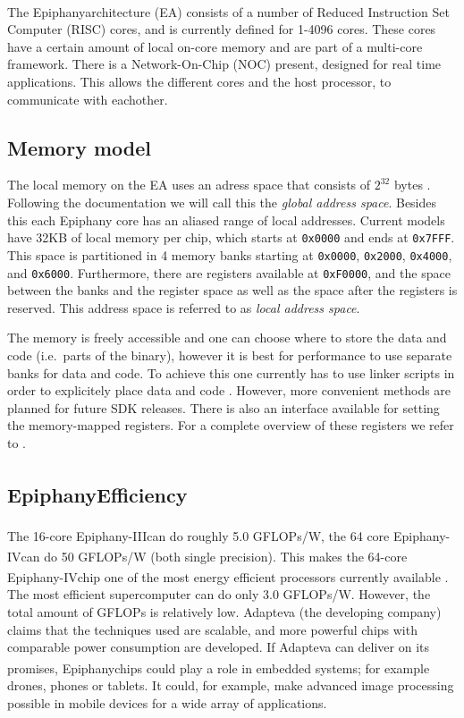 \documentclass[fleqn]{article}
\renewcommand{\(}{\left(}
\renewcommand{\)}{\right)}
\newcommand{\tm}{\textsuperscript{\texttrademark}}
\begin{document}
The Epiphany\tm architecture (EA) consists of a number of Reduced Instruction Set Computer (RISC) cores, and is currently defined for 1-4096 cores. These cores have a certain amount of local on-core memory and are part of a multi-core framework. There is a Network-On-Chip (NOC) present, designed for real time applications. This allows the different cores and the host processor, to communicate with eachother. 

\subsection{Memory model}

The local memory on the EA uses an adress space that consists of $2^{32}$ bytes \cite{ep:sdkdoc}. Following the documentation we will call this the \emph{global address space}. Besides this each Epiphany core has an aliased range of local addresses. Current models have 32KB of local memory per chip, which starts at \texttt{0x0000} and ends at \texttt{0x7FFF}. This space is partitioned in 4 memory banks starting at \texttt{0x0000}, \texttt{0x2000}, \texttt{0x4000}, and \texttt{0x6000}. Furthermore, there are registers available at \texttt{0xF0000}, and the space between the banks and the register space as well as the space after the registers is reserved. This address space is referred to as \emph{local address space}.



The memory is freely accessible and one can choose where to store the data and code (i.e.\ parts of the binary), however it is best for performance to use separate banks for data and code. To achieve this one currently has to use linker scripts in order to explicitely place data and code \cite{ep:sdkdoc}. However, more convenient methods are planned for future SDK releases. There is also an interface available for setting the memory-mapped registers. For a complete overview of these registers we refer to \cite{ep:archdoc}.

\subsection{Epiphany\tm Efficiency}
The 16-core Epiphany-III\tm can do roughly 5.0 GFLOPs/W, the 64 core Epiphany-IV\tm can do 50 GFLOPs/W (both single precision). This makes the 64-core Epiphany-IV\tm chip one of the most energy efficient processors currently available \cite{ep:power}. The most efficient supercomputer can do only 3.0 GFLOPs/W. However, the total amount of GFLOPs is relatively low. Adapteva (the developing company) claims that the techniques used are scalable, and more powerful chips with comparable power consumption are developed. If Adapteva can deliver on its promises, Epiphany\tm chips could play a role in embedded systems; for example drones, phones or tablets. It could, for example, make advanced image processing possible in mobile devices for a wide array of applications.
\end{document}
